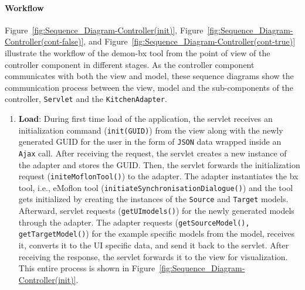 \paragraph{Workflow}
Figure~\ref{fig:Sequence_Diagram-Controller(init)}, 
Figure~\ref{fig:Sequence_Diagram-Controller(cont-false)},
and Figure~\ref{fig:Sequence_Diagram-Controller(cont-true)} illustrate the workflow of the demon-bx tool from the point of view of the controller component in different stages. As the controller component communicates with both the view and model, these sequence diagrams show the communication process between the view, model and the sub-components of the controller, \texttt{Servlet} and the \texttt{KitchenAdapter}.

\begin{enumerate}
	\item {\textbf{Load}: During first time load of the application, the servlet receives an initialization command (\texttt{init(GUID)}) from the view along with the newly generated GUID for the user in the form of \texttt{JSON} data wrapped inside an \texttt{Ajax} call. After receiving the request, the servlet creates a new instance of the adapter and stores the GUID. Then, the servlet forwards the initialization request (\texttt{initeMoflonTool()}) to the adapter. The adapter instantiates the bx tool, i.e., eMoflon tool (\texttt{initiateSynchronisationDialogue()}) and the tool gets initialized by creating the instances of the \texttt{Source} and \texttt{Target} models. Afterward, servlet requests 
	(\texttt{getUImodels()}) for the newly generated models through the adapter. The adapter requests (\texttt{getSourceModel(), getTargetModel()}) for the example specific models from the model, receives it, converts it to the UI specific data, and send it back to the servlet. After receiving the response, the servlet forwards it to the view for visualization. This entire process is shown in Figure~\ref{fig:Sequence_Diagram-Controller(init)}.}
		

\end{enumerate}
